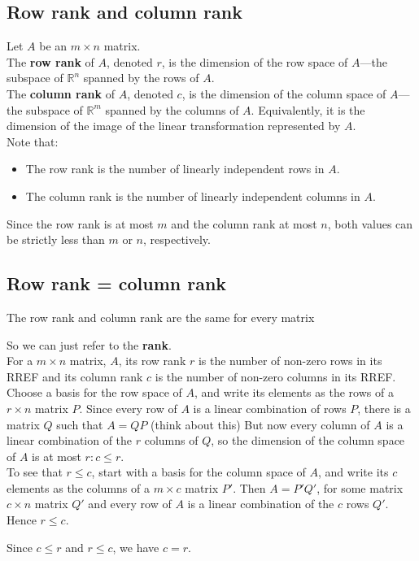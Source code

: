 \documentclass[a4paper, 9pt]{extarticle}
\begin{document}
\subsection{Row rank and column rank}
Let $A$ be an $m \times n$ matrix. \\[2ex]
The \textbf{row rank} of $A$, denoted $r$, is the dimension of the row space of $A$—the subspace of $\mathbb{R}^n$ spanned by the rows of $A$. \\[2ex]
The \textbf{column rank} of $A$, denoted $c$, is the dimension of the column space of $A$—the subspace of $\mathbb{R}^m$ spanned by the columns of $A$. Equivalently, it is the dimension of the image of the linear transformation represented by $A$. \\[2ex]
Note that:
\begin{itemize}
  \item The row rank is the number of linearly independent rows in $A$.
  \item The column rank is the number of linearly independent columns in $A$.
\end{itemize}
Since the row rank is at most $m$ and the column rank at most $n$, both values can be strictly less than $m$ or $n$, respectively.

\subsection{Row rank = column rank}
\begin{theorembox}{}{}
  The row rank and column rank are the same for every matrix
\end{theorembox}
\noindent So we can just refer to the \textbf{rank}. \\[2ex]
For a $m \times n$ matrix, $A$, its row rank $r$ is the number of non-zero rows in its RREF and its column rank $c$ is the number of non-zero columns in its RREF. \\[2ex]
Choose a basis for the row space of $A$, and write its elements as the rows of a $r \times n $ matrix $P$. Since every row of $A$ is a linear combination of rows $P$, there is a matrix $Q$ such that $A = QP$ (think about this)
But now every column of $A$ is a linear combination of the $r$ columns of $Q$, so the dimension of the column space of $A$ is at most $r : c \leq r$. \\[2ex]

To see that $r \leq c$, start with a basis for the column space of $A$, and write its $c$ elements as the columns of a $m \times c$ matrix $P'$. Then $A = P'Q'$, for some matrix $c \times n$ matrix $Q'$ and every row of $A$ is a linear combination of the $c$ rows $Q'$. Hence $r \leq c$.

Since $c \leq r$ and $r \leq c$, we have $c = r$. \\[2ex]
\end{document}
